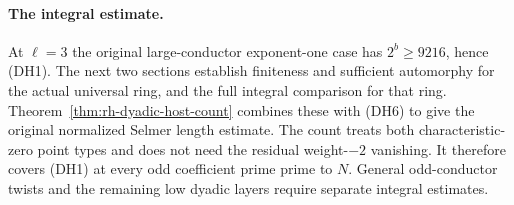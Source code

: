 \paragraph{The integral estimate.}
At $\ell=3$ the original large-conductor exponent-one case has
$2^b\ge9216$, hence (DH1). The next two sections establish
finiteness and sufficient automorphy for the actual universal
ring, and the full integral comparison for that ring.
Theorem~\ref{thm:rh-dyadic-host-count} combines these with
(DH6) to give the original normalized Selmer length estimate.
The count treats both characteristic-zero point types and does
not need the residual weight-$-2$ vanishing. It therefore covers
(DH1) at every odd coefficient prime prime to $N$. General
odd-conductor twists and the remaining low dyadic layers
require separate integral estimates.
